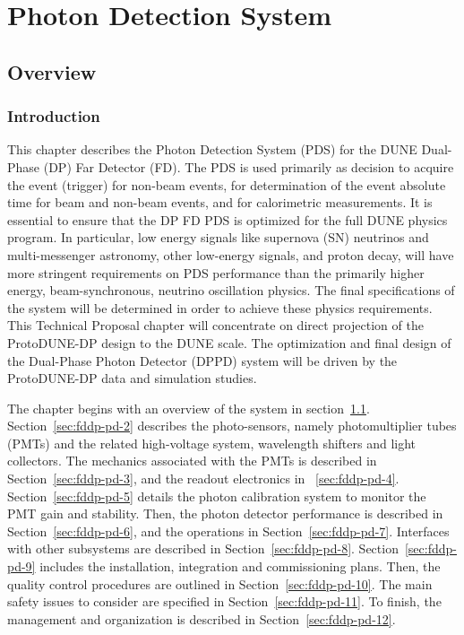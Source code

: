 \chapter{Photon Detection System}
\label{ch:fddp-pd}

\section{Overview}
\label{sec:fddp-pd-1}

\subsection{Introduction}
\label{sec:fddp-pd-1.1}

This chapter describes the Photon Detection System (PDS) for the DUNE Dual-Phase (DP) Far Detector (FD). The PDS is used primarily as decision to acquire the event (trigger) for non-beam events, for determination of the event absolute time for beam and non-beam events, and for calorimetric measurements. It is essential to ensure that the DP FD PDS is optimized for the full DUNE physics program. In particular, low energy signals like supernova (SN) neutrinos and multi-messenger astronomy, other low-energy signals, and proton decay, will have more stringent requirements on PDS performance than the primarily higher energy, beam-synchronous, neutrino oscillation physics. The final specifications of the system will be determined in order to achieve these physics requirements. This Technical Proposal chapter will concentrate on direct projection of the ProtoDUNE-DP design to the DUNE scale. The optimization and final design of the Dual-Phase Photon Detector (DPPD) system will be driven by the ProtoDUNE-DP \cite{protoDUNDP-tdr} data and simulation studies.

The chapter begins with an overview of the system in section~\ref{sec:fddp-pd-1}. Section~\ref{sec:fddp-pd-2} describes the photo-sensors, namely photomultiplier tubes (PMTs) and the related high-voltage system, wavelength shifters and light collectors. The mechanics associated with the PMTs is described in Section~\ref{sec:fddp-pd-3}, and the readout electronics in ~\ref{sec:fddp-pd-4}. Section~\ref{sec:fddp-pd-5} details the photon calibration system to monitor the PMT gain and stability. Then, the photon detector performance is described in Section~\ref{sec:fddp-pd-6}, and the operations in Section~\ref{sec:fddp-pd-7}. Interfaces with other subsystems are described in Section~\ref{sec:fddp-pd-8}. Section~\ref{sec:fddp-pd-9} includes the installation, integration and commissioning plans. Then, the quality control procedures are outlined in Section~\ref{sec:fddp-pd-10}. The main safety issues to consider are specified in Section~\ref{sec:fddp-pd-11}. To finish, the management and organization is described in Section~\ref{sec:fddp-pd-12}.

